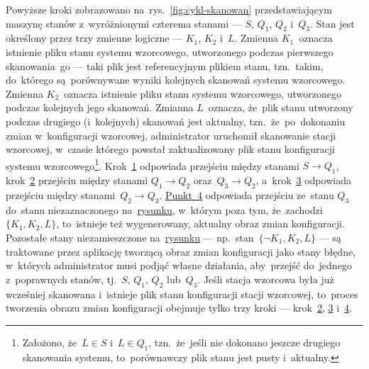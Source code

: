 \documentclass[thesis]{subfiles}
\begin{document}
Powyższe kroki zobrazowano na~rys.~\ref{fig:cykl-skanowan} przedstawiającym maszynę stanów z~wyróżnionymi czterema stanami --- $S$, $Q_1$, $Q_2$ i~$Q_3$. Stan jest określony przez trzy zmienne logiczne --- $K_1$, $K_2$ i~$L$. Zmienna $K_1$~oznacza istnienie pliku stanu systemu wzorcowego, utworzonego podczas pierwszego skanowania~go --- taki plik jest referencyjnym plikiem stanu, tzn.~takim, do~którego są~porównywane wyniki kolejnych skanowań systemu wzorcowego. Zmienna $K_2$~oznacza istnienie pliku stanu systemu wzorcowego, utworzonego podczas kolejnych jego skanowań. Zmianna $L$~oznacza, że~plik stanu utworzony podczas drugiego (i~kolejnych) skanowań jest aktualny, tzn.~że~po~dokonaniu zmian w~konfiguracji wzorcowej, administrator uruchomił skanowanie stacji wzorcowej, w~czasie którego powstał zaktualizowany plik stanu konfiguracji systemu wzorcowego\footnote{Założono, że~$L\in S$ i~$L\in Q_1$, tzn.~że~jeśli nie dokonano jeszcze drugiego skanowania systemu, to~porównawczy plik stanu jest pusty i~aktualny.}. Krok~\hyperlink{itm:pierwsze-skanowanie}{1} odpowiada przejściu między stanami $S\rightarrow Q_1$, krok~\hyperlink{itm:dokonanie-zmian}{2} przejściu między stanami $Q_1\rightarrow Q_2$ oraz~$Q_3\rightarrow Q_2$, a~krok~\hyperlink{itm:drugie-skanowanie}{3} odpowiada przejściu między stanami~$Q_2\rightarrow Q_3$. \hyperlink{itm:stworzenie-obrazu-konfiguracji}{Punkt~4} odpowiada przejściu ze~stanu $Q_3$ do~stanu niezaznaczonego na~\hyperref[fig:cykl-skanowan]{rysunku}, w~którym poza tym, że~zachodzi $\{K_1, K_2, L\}$, to~istnieje też wygenerowany, aktualny obraz zmian konfiguracji. Pozostałe stany niezamieszczone na~\hyperref[fig:cykl-skanowan]{rysunku} --- np.~stan~$\{\neg K_1,K_2,L\}$ --- są traktowane przez aplikację tworzącą obraz zmian konfiguracji jako stany błędne, w~których administrator musi podjąć własne działania, aby~przejść do~jednego z~poprawnych stanów, tj.~$S$, $Q_1$, $Q_2$ lub~$Q_3$. Jeśli stacja wzorcowa była już wcześniej skanowana i~istnieje plik stanu konfiguracji stacji wzorcowej, to~proces tworzenia obrazu zmian konfiguracji obejmuje tylko trzy kroki --- krok~\hyperlink{itm:dokonanie-zmian}{2}, \hyperlink{itm:drugie-skanowanie}{3} i~\hyperlink{itm:stworzenie-obrazu-konfiguracji}{4}.
\end{document}

